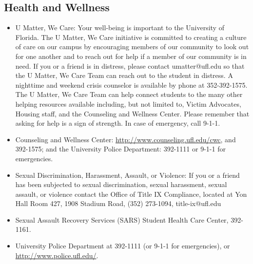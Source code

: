 \documentclass[11pt, article, oneside]{memoir}
\begin{document}
\subsection{Health and Wellness}
\begin{itemize}
\item U Matter, We Care: Your well-being is important to the University of Florida. The U Matter, We Care initiative is committed to creating a culture of care on our campus by encouraging members of our community to look out for one another and to reach out for help if a member of our community is in need. If you or a friend is in distress, please contact umatter@ufl.edu so that the U Matter, We Care Team can reach out to the student in distress. A nighttime and weekend crisis counselor is available by phone at 352-392-1575. The U Matter, We Care Team can help connect students to the many other helping resources available including, but not limited to, Victim Advocates, Housing staff, and the Counseling and Wellness Center. Please remember that asking for help is a sign of strength. In case of emergency, call 9-1-1.
\item Counseling and Wellness Center: \url{http://www.counseling.ufl.edu/cwc}, and 392-1575; and the University Police Department: 392-1111 or 9-1-1 for emergencies.
\item Sexual Discrimination, Harassment, Assault, or Violence: If you or a friend has been subjected to sexual discrimination, sexual harassment, sexual assault, or violence contact the Office of Title IX Compliance, located at Yon Hall Room 427, 1908 Stadium Road, (352) 273-1094, title-ix@ufl.edu
\item Sexual Assault Recovery Services (SARS) Student Health Care Center, 392-1161.
\item University Police Department at 392-1111 (or 9-1-1 for emergencies), or \url{http://www.police.ufl.edu/}.
\end{itemize}
\end{document}
